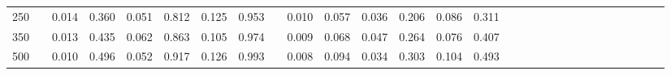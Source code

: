 % 
\begin{tabular}{ccccccccccccccccccccccccccccc}
  \hline
  \hline
250 &  & 0.014 & 0.360 & 0.051 & 0.812 & 0.125 & 0.953 &  & 0.010 & 0.057 & 0.036 & 0.206 & 0.086 & 0.311 &  &  &  &  &  &  &  &  &  &  &  &  &  &  \\ 
  350 &  & 0.013 & 0.435 & 0.062 & 0.863 & 0.105 & 0.974 &  & 0.009 & 0.068 & 0.047 & 0.264 & 0.076 & 0.407 &  &  &  &  &  &  &  &  &  &  &  &  &  &  \\ 
  500 &  & 0.010 & 0.496 & 0.052 & 0.917 & 0.126 & 0.993 &  & 0.008 & 0.094 & 0.034 & 0.303 & 0.104 & 0.493 &  &  &  &  &  &  &  &  &  &  &  &  &  &  \\ 
   \hline
\end{tabular}
